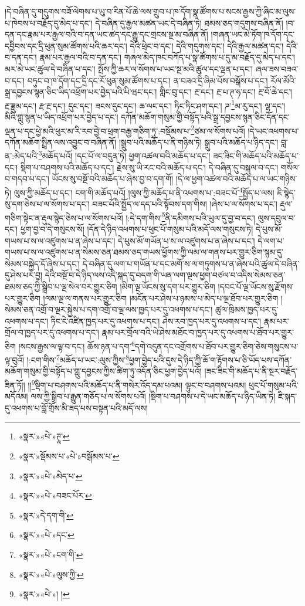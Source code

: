 །དེ་བཞིན་དུ་གདུགས་བཟོ་ལེགས་པ་ཡུ་བ་རིན་པོ་ཆེ་ལས་གྲུབ་པ་ཁ་དོག་སྣ་ཚོགས་པ་སངས་རྒྱས་ཀྱི་ཞིང་མ་ལུས་པ་ཁེབས་པ་བརྗོད་དུ་མེད་པ་དང་། དེ་བཞིན་དུ་རྒྱལ་མཚན་ཡང་དེ་བཞིན་ཏེ། ཐམས་ཅད་གདུགས་བཞིན་ནོ། །བ་དན་དང་རྣམ་པར་རྒྱལ་བའི་བ་དན་ཡང་ཚད་དང་རྒྱུ་དང་གྲངས་སྔ་མ་བཞིན་ནོ། །གཞན་ཡང་མེ་ཏོག་ཁ་དོག་དང་དབྱིབས་དང་དྲི་ཕུན་སུམ་ཚོགས་པའི་ཆར་དང་། དེའི་ཕྲེང་བ་དང་། དེའི་གདུགས་དང་། དེའི་རྒྱལ་མཚན་དང་། དེའི་བ་དན་དང་། རྣམ་པར་རྒྱལ་བའི་བ་དན་དང་། གཞལ་མེད་ཁང་བཀོད་པ་སྣ་ཚོགས་པ་དུ་མ་བརྗོད་དུ་མེད་པ་དང་། མར་མེ་ཡང་ཚུལ་དེ་བཞིན་པ་དང་། སྤོས་ཀྱི་ཆར་ལ་སོགས་པ་ཡང་སྔ་མའི་ཚུལ་དང་ལྡན་པ་དང་། ཞལ་ཟས་བཟའ་བ་དང་། བཏུང་བ་ཁ་དོག་དང་དྲི་དང་རོ་ཕུན་སུམ་ཚོགས་པ་དང་། ན་བཟའ་དྲི་ཞིམ་པོས་བསྒོས་པ་དང་། རོལ་མོའི་སྒྲ་དབྱངས་སྙན་ཅིང་ཡིད་འཕྲོག་པར་བྱེད་པའི་པི་ཝང་དང་། གླིང་བུ་དང་། རྔ་དང་། རྔ་པ་ཊ་ཧ་དང་། རྔ་བོ་ཆེ་དང་། རྔ་ཟླུམ་དང་། རྫ་རྔ་དང་། དུང་དང་། ཟངས་དུང་དང་། ཆ་ལང་དང་། ཏིང་ཏིང་ཤག་དང་། ཌ་\footnote{«སྣར་»«པེ་»ཊཱ་}མ་རུ་དང་། ལྷ་དང་། མིའི་གླུ་སྙན་པ་ཡིད་འཕྲོག་པར་བྱེད་པ་དང་། དཀོན་མཆོག་གསུམ་གྱི་བསྟོད་པའི་སྒྲ་དབྱངས་སྙན་ཅིང་དོན་དང་ལྡན་པ་དང་ཕྱེ་མའི་ཕུར་མ་རི་རབ་བྱེ་བ་ཕྲག་བརྒྱ་གཅིག་ཏུ་:བསྡོམས་པ་\footnote{«སྣར་»སྡོམས་པ་«པེ་»བསྒོམས་པ་}ཙམ་ལ་སོགས་པའོ། །དེ་ཡང་འཕགས་པ་དཀོན་མཆོག་སྤྲིན་ལས་འབྱུང་བ་བཞིན་ནོ། །སྒྲུབ་པའི་མཆོད་པ་ནི་གཉིས་ཏེ། སྒྲུབ་པའི་མཆོད་པ་ཉིད་དང་། བླ་ན་:མེད་པའི་\footnote{«སྣར་»«པེ་»མེད་པ་}མཆོད་པའོ། །དང་པོ་ལ་བདུན་ཏེ། ཕྱག་འཚལ་བའི་མཆོད་པ་དང་། ཟང་ཟིང་གི་མཆོད་པའི་མཆོད་པ་དང་། སྡིག་པ་བཤགས་པའི་མཆོད་པ་དང་། རྗེས་སུ་ཡི་རང་བའི་མཆོད་པ་དང་། དེ་བཞིན་དུ་བསྐུལ་བ་དང་། གསོལ་བ་གདབ་པ་དང་། ཡོངས་སུ་བསྔོ་བའི་མཆོད་པ་ཞེས་བྱ་བ་དག་གོ། །དེ་ལ་ཕྱག་འཚལ་བའི་མཆོད་པ་ལ་ཡང་གཉིས་ཏེ། ལུས་ཀྱི་མཆོད་པ་དང་། ངག་གི་མཆོད་པའོ། །ལུས་ཀྱི་མཆོད་པ་ནི་འཕགས་པ་:བཟང་པོ་\footnote{«སྣར་»«པེ་»བཟང་པོར་}སྤྱོད་པ་ལས། ཇི་སྙེད་སུ་དག་ཅེས་པ་ལ་སོགས་པ་དང་། བཟང་པོའི་སྤྱོད་ལ་དད་པའི་སྟོབས་དག་གིས། །ཞེས་པ་ལ་སོགས་པ་དང་། རྡུལ་གཅིག་སྟེང་ན་རྡུལ་སྙེད་ཅེས་པ་ལ་སོགས་པའོ། །:དེ་དག་གིས་\footnote{«སྣར་»དེ་དག་གི་}ནི་དམིགས་པའི་ཡུལ་དུ་བྱ་བ་དང་། ལུས་དབུལ་བ་དང་། ཕྱག་བྱ་བ་དེ་གསུངས་སོ། །དོན་དེ་ཉིད་འཕགས་པ་ཕུང་པོ་གསུམ་པའི་མདོ་ལས་གསུངས་ཏེ། དེ་པུས་མོ་གཡས་པ་ས་ལ་འཛུགས་པ་ན་ཞེས་པ་དང་། དེ་པུས་མོ་གཡོན་པ་ས་ལ་འཛུགས་པ་ན་ཞེས་པ་དང་། དེ་ལག་པ་གཡས་པ་ས་ལ་འཛུགས་པ་ན་སེམས་ཅན་ཐམས་ཅད་གཡས་ཕྱོགས་ཀྱི་ལམ་ལ་གནས་པར་གྱུར་ཅིག་སྙམ་དུ་སེམས་བསྐྱེད་དོ་ཞེས་པ་དང་། དེ་བཞིན་དུ་ལག་པ་གཡོན་པ་དང་མགོ་ས་ལ་གཏུགས་པ་ན་ཞེས་པའི་ཚུལ་དེ་བཞིན་དུ་ཤེས་པར་བྱ། དེའི་བསྔོ་བ་དེ་ཉིད་ལས་འདི་སྐད་དུ་བདག་གི་ཡན་ལག་ལྔས་ཕྱག་བཙལ་བ་འདིས་སེམས་ཅན་ཐམས་ཅད་ཀྱི་སྒྲིབ་པ་ལྔ་སེལ་བར་གྱུར་ཅིག །མིག་ལྔ་ཡོངས་སུ་དག་པར་གྱུར་ཅིག །དབང་པོ་ལྔ་ཡོངས་སུ་རྫོགས་པར་གྱུར་ཅིག །ལམ་ལྔ་ལ་གནས་པར་གྱུར་ཅིག །མངོན་པར་ཤེས་པ་ཉམས་པ་མེད་པ་ལྔ་ཐོབ་པར་གྱུར་ཅིག །སེམས་ཅན་འགྲོ་བ་ལྔར་སྐྱེས་པ་དག་འགྲོ་བ་ལྔ་ལས་ཁྱད་པར་དུ་འཕགས་པ་དང་། ཚུལ་ཁྲིམས་ཁྱད་པར་དུ་འཕགས་པ་དང་། ཏིང་ངེ་འཛིན་ཁྱད་པར་དུ་འཕགས་པ་དང་། ཤེས་རབ་ཁྱད་པར་དུ་འཕགས་པ་དང་། རྣམ་པར་གྲོལ་བ་ཁྱད་པར་དུ་འཕགས་པ་དང་། རྣམ་པར་གྲོལ་བའི་ཡེ་ཤེས་མཐོང་བ་ཁྱད་པར་དུ་འཕགས་པ་ཐོབ་པར་གྱུར་ཅིག །སངས་རྒྱས་ལ་ལྟ་བ་དང་། ཆོས་ཉན་པ་དག་\footnote{«སྣར་»«པེ་»དང་}དགེ་འདུན་དང་འགྲོགས་པ་ཐོབ་པར་གྱུར་ཅིག་ཅེས་གསུངས་པ་ལྟ་བུའོ། །:ངག་གིས་\footnote{«སྣར་»«པེ་»ངག་གི་}མཆོད་པ་ཡང་:ལུས་ཀྱིས་\footnote{«སྣར་»«པེ་»ལུས་ཀྱི་}ཕྱག་བྱེད་པའི་དུས་དེ་ཉིད་ཀྱི་ཆོ་ག་རྟོགས་པ་ཅི་ཡོད་པས་དཀོན་མཆོག་གསུམ་གྱི་བསྟོད་པ་གླུ་དབྱངས་ཀྱིས་ཚིག་ཏུ་འདོན་ཅིང་ཕྱག་བྱེད་པའོ། །ཟང་ཟིང་གི་མཆོད་པ་ནི་སྔར་བརྗོད་ཟིན་ཏོ།། །།\footnote{«སྣར་»«པེ་»། །}སྡིག་པ་བཤགས་པའི་མཆོད་པ་ནི་གསེར་འོད་དམ་པའམ། ལྟུང་བ་བཤགས་པའམ། ཕུང་པོ་གསུམ་པའི་མདོའམ། ལས་ཀྱི་སྒྲིབ་པ་རྒྱུན་གཅོད་པ་ལ་སོགས་པའོ། །སྡིག་པ་བཤགས་པ་དེ་ཡང་མཆོད་པ་ཉིད་ཡིན་ཏེ། ཇི་སྐད་དུ་འཕགས་པ་བློ་གྲོས་མི་ཟད་པས་བསྟན་པའི་མདོ་ལས། 